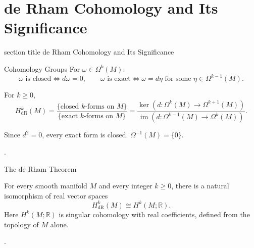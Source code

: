 \documentclass[aspectratio=169,11pt]{beamer}
\newcommand{\slidetitlesection}[1]{%
  \section{#1}%
  \begin{frame}
    \vfill
    \begin{beamercolorbox}[sep=12pt,center,wd=\paperwidth]{section title}
      \usebeamerfont{section title}\insertsectionnumber\quad #1
    \end{beamercolorbox}
    \vfill
  \end{frame}%
}
\newcommand{\sources}[1]{\par\vfill{\scriptsize\color{black!75}#1\par}}
\begin{document}
\slidetitlesection{de Rham Cohomology and Its Significance}

\begin{frame}{Cohomology Groups}
  For $\omega\in\Omega^k(M)$:
  \begin{equation}
    \omega\text{ is closed}\iff d\omega=0,
    \qquad
    \omega\text{ is exact}\iff\omega=d\eta
    \text{ for some }\eta\in\Omega^{k-1}(M).
  \end{equation}
  \begin{definition}
    For $k\ge0$,
    \begin{equation}
      H^k_{\mathrm{dR}}(M)
      =\frac{\{\text{closed }k\text{-forms on }M\}}
            {\{\text{exact }k\text{-forms on }M\}}
      =\frac{\ker\!\left(d\colon\Omega^k(M)\to\Omega^{k+1}(M)\right)}
            {\operatorname{im}\!\left(d\colon\Omega^{k-1}(M)\to\Omega^k(M)\right)}.
    \end{equation}
  \end{definition}
  Since $d^2=0$, every exact form is closed.
  \hfill{\small $\Omega^{-1}(M)=\{0\}$.}
  \sources{\cite[p.~441]{lee2013smooth}.}
\end{frame}


\begin{frame}{The de Rham Theorem}
  \begin{theorem}[de Rham]
    For every smooth manifold $M$ and every integer $k\ge0$, there is a natural
    isomorphism of real vector spaces
    \begin{equation}
      H^k_{\mathrm{dR}}(M)\cong H^k(M;\mathbb{R}).
    \end{equation}
    Here $H^k(M;\mathbb{R})$ is singular cohomology with real coefficients,
    defined from the topology of $M$ alone.
  \end{theorem}
  \sources{\cite[Proposition~18.13, pp.~482--483; Theorem~18.14, p.~484]{lee2013smooth}.}
\end{frame}
\end{document}
